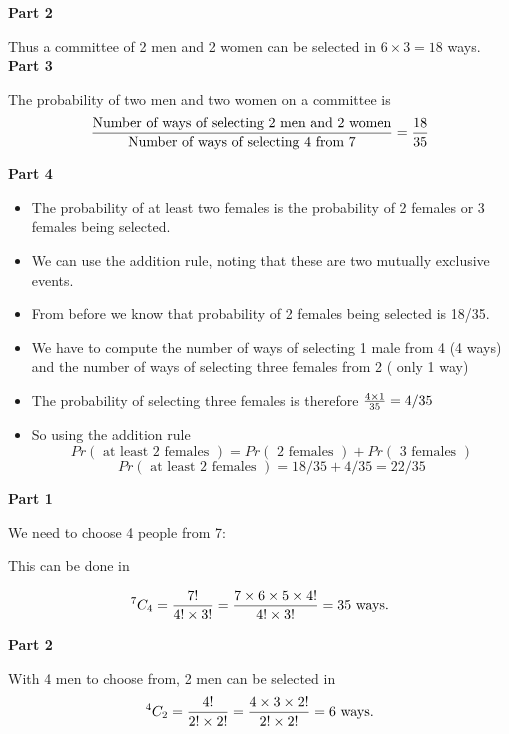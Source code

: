 \documentclass[12pt]{report}
\begin{document}
	{\Large
		
		\textbf{Part 2}
		
		Thus a committee of 2 men and 2 women can be selected in $ 6 \times 3  = 18 $ ways.\\
		\bigskip
		\textbf{Part 3}
		
		The probability of two men and two women on a committee is
		\[ {\mbox{Number of ways of selecting 2 men and 2 women} \over \mbox{Number of ways of selecting 4 from 7}} = {18 \over 35 }\]
		
		
		
		\textbf{Part 4}
		\begin{itemize}
			\item The probability of at least two females is the probability of 2 females or 3 females being selected.
			\item We can use the addition rule, noting that these are two mutually exclusive events.
			\item From before we know that probability of 2 females being selected is 18/35.
			\item We have to compute the number of ways of selecting 1 male from 4 (4 ways) and the number of ways of selecting three females from 2 ( only 1 way)
			\item The probability of selecting three females is therefore ${4 \times 1 \over 35} = 4/35$
			\item So using the addition rule
			\[ Pr(\mbox{ at least 2 females }) = Pr(\mbox{ 2 females }) + Pr(\mbox{ 3 females }) \]
			\[ Pr(\mbox{ at least 2 females })  = 18/35 + 4/35 = 22/35 \]
		\end{itemize}
		
	}
	
	\textbf{Part 1}
	
	We need to choose 4 people from 7:
	
	This can be done in
	
	\[
	^7 C_4  = {7!  \over 4! \times 3!} =  {7 \times 6 \times 5 \times 4!  \over 4! \times 3!} = 35 \mbox{ ways.}
	\]
	
	
	\textbf{Part 2}
	
	With 4 men to choose from, 2 men can be selected in \[
	^4 C_2  = {4!  \over 2! \times 2!} =  {4 \times 3 \times 2!  \over 2! \times 2!} = 6\mbox{ ways.}
	\]
	
\end{document}
